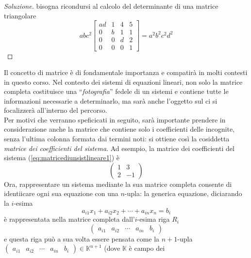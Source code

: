 \documentclass{book}
\theoremstyle{definition}
\theoremstyle{plain}
\begin{document}
\begin{proof}[Soluzione]
  \label{sol:prodeldet1}
  bisogna ricondursi al calcolo del determinante di una matrice
  triangolare
  \begin{equation*}
    abc^2
    \begin{bmatrix}
      ad & 1 & 4 & 5\\
      0 & b & 1 & 1 \\
      0 & 0 & d & 2\\
      0 & 0 & 0 & 1
    \end{bmatrix}=a^2b^2c^2d^2
  \end{equation*}
\end{proof}
Il concetto di matrice è di fondamentale importanza e compatirà in molti
contesti in questo corso. Nel contesto dei sistemi di equazioni lineari,
non solo la matrice completa costituisce una ``\emph{fotografia}'' fedele
di un sistemi e contiene tutte le informazioni necessarie a determinarlo,
ma sarà anche l'oggetto sul ci si focalizzerà all'interno del percorso.\\
Per motivi che verranno speficicati in seguito, sarà importante prendere
in considerazione anche la matrice che contiene solo i coefficienti delle
incognite, senza l'ultima colonna formata dai termini noti: si ottiene
così la cosiddetta \textit{matrice dei coefficienti del sistema}. Ad
esempio, la matrice dei coefficienti del sistema
(\ref{eq:matricediunsistlineare1}) è
\begin{equation}
  \label{eq:determinante2}
  \begin{pmatrix}
    1 & 3\\
    2 & -1
  \end{pmatrix}
\end{equation}
Ora, rappresentare un sistema mediante la sua matrice completa consente
di identiicare ogni sua equazione con una $n$-upla: la generica equazione,
diciarando la $i$-esima
\begin{equation}
  \label{eq:determinante3}
  a_{i1}x_1+a_{i2}x_2+\cdots+a_{in}x_n=b_i
\end{equation}
è rappresentata nella matrice completa dall'$i$-esima riga $R_i$
\begin{equation*}
  \begin{pmatrix}
    a_{i1} & a_{i2} & \cdots & a_{in} &b_i 
  \end{pmatrix}
\end{equation*}
e questa riga può a sua volta essere pensata come la $n+1$-upla
$\begin{pmatrix}
    a_{i1} & a_{i2} & \cdots & a_{in} &b_i 
\end{pmatrix}\in \mathds{K}^{n+1}$ (dove $\mathds{K}$ è campo dei
\end{document}
